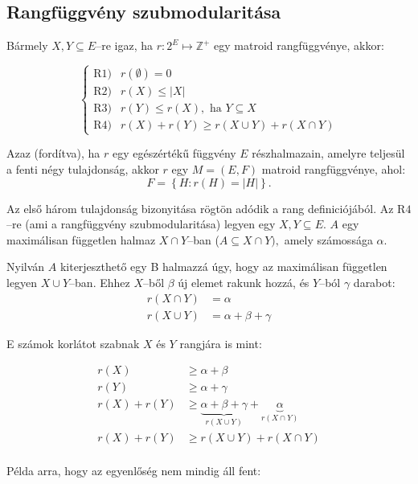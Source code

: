 \subsection{Rangfüggvény szubmodularitása}
Bármely $X, Y \subseteq E$--re igaz, ha $r:2^E \mapsto \mathbb{Z}^+$ egy matroid
rangfüggvénye, akkor:

\[
\begin{cases}
\mbox{R1)}& r(\emptyset) = 0 \\
\mbox{R2)}& r(X) \leq |X| \\
\mbox{R3)}& r(Y) \leq r(X), \mbox{ ha } Y \subseteq X \\
\mbox{R4)}& r(X)+ r(Y) \geq r(X \cup Y) + r (X \cap Y)
\end{cases}
\]

Azaz (fordítva), ha $r$ egy egészértékű függvény $E$ részhalmazain, amelyre
teljesül a fenti négy tulajdonság, akkor $r$ egy $M=(E,F)$ matroid rangfüggvénye,
ahol:
\[F=\left\{ H : r(H)=|H| \right\}. \]

Az első három tulajdonság bizonyitása rögtön adódik a rang definiciójából. Az
R$4$--re (ami a rangfüggvény szubmodularitása) legyen egy $X,Y \subseteq E$. $A$
egy maximálisan független halmaz $X \cap Y$--ban ($A \subseteq X \cap Y),$ amely
számossága $\alpha$.

Nyilván $A$ kiterjeszthető egy B halmazzá úgy, hogy az maximálisan független
legyen $X \cup Y$--ban. Ehhez $X$--ből $\beta$ új elemet rakunk hozzá, és
$Y$--ból $\gamma$ darabot:
\begin{align*}
r(X \cap Y) &= \alpha \\
r(X \cup Y) &= \alpha + \beta + \gamma
\end{align*}

E számok korlátot szabnak $X$ és $Y$ rangjára is mint:

\begin{align*}
r(X) &\geq \alpha + \beta \\
r(Y) &\geq \alpha + \gamma \\
r(X) + r(Y) &\geq \underbrace{\alpha + \beta + \gamma}_{r(X \cup Y)} + \underbrace{\alpha}_{r(X \cap Y)} \\
r(X) + r(Y) &\geq r(X \cup Y) + r(X \cap Y) \\
\end{align*}

Példa arra, hogy az egyenlőség nem mindig áll fent:
\vspace{0.4cm}

